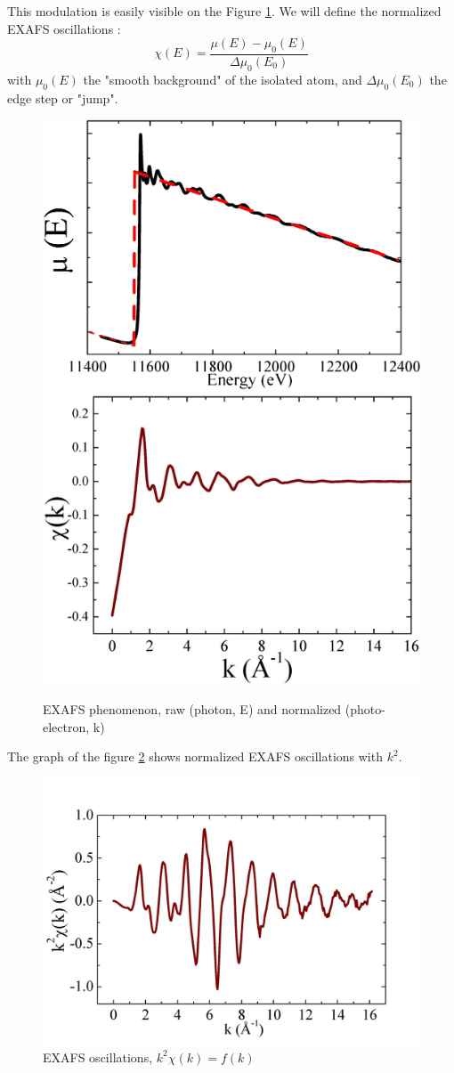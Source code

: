 \documentclass[11pt,a4paper,oneside]{report}
\begin{document}
This modulation is easily visible on the Figure \ref{exafsgraph}. We will define the normalized EXAFS oscillations :
\[\chi(E) = \frac{\mu(E) - \mu_0(E)}{\Delta\mu_0(E_0)}\]
with $\mu_0(E)$ the "smooth background" of the isolated atom, and $\Delta\mu_0(E_0)$ the edge step or "jump".

\begin{figure}[H]
    \begin{center}
        \includegraphics[height=0.35\textwidth]{Images/EXAFS2}
        \includegraphics[height=0.35\textwidth]{Images/relativeEXAFS}
        \caption{EXAFS phenomenon, raw (photon, E) and normalized (photo-electron, k)}
        \label{exafsgraph}
    \end{center}
\end{figure}

The graph of the figure \ref{exafsgraphtimesksquare} shows normalized EXAFS oscillations with $k^2$.

\begin{figure}[H]
    \begin{center}
        \includegraphics[height=0.35\textwidth]{Images/EXAFS3}
        \caption{EXAFS oscillations, $k^2\chi(k) = f (k)$}
        \label{exafsgraphtimesksquare}
    \end{center}
\end{figure}
\end{document}

